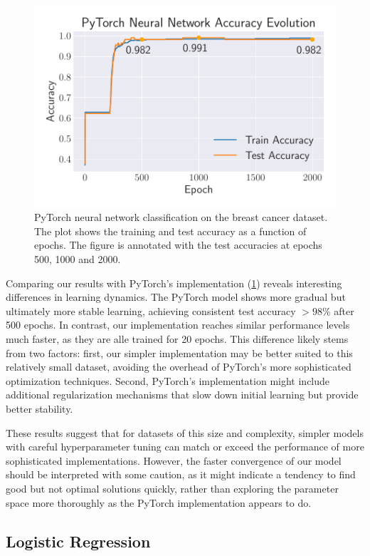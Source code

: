 \begin{figure}[h!]
    \centering
    \includegraphics[width =.45\textwidth]{../figs/nn_torch_breast_cancer.pdf}
    \caption{PyTorch neural network classification on the breast cancer dataset. The plot shows the training and test accuracy as a function of epochs. The figure is annotated with the test accuracies at epochs 500, 1000 and 2000.}
    \label{fig:NN_Torch_breast_cancer}
\end{figure}

Comparing our results with PyTorch's implementation (\cref{fig:NN_Torch_breast_cancer}) reveals interesting differences in learning dynamics. The PyTorch model shows more gradual but ultimately more stable learning, achieving consistent test accuracy $>98\%$ after 500 epochs. In contrast, our implementation reaches similar performance levels much faster, as they are alle trained for 20 epochs. This difference likely stems from two factors: first, our simpler implementation may be better suited to this relatively small dataset, avoiding the overhead of PyTorch's more sophisticated optimization techniques. Second, PyTorch's implementation might include additional regularization mechanisms that slow down initial learning but provide better stability.

These results suggest that for datasets of this size and complexity, simpler models with careful hyperparameter tuning can match or exceed the performance of more sophisticated implementations. However, the faster convergence of our model should be interpreted with some caution, as it might indicate a tendency to find good but not optimal solutions quickly, rather than exploring the parameter space more thoroughly as the PyTorch implementation appears to do.

\onecolumngrid
\subsection{Logistic Regression}

